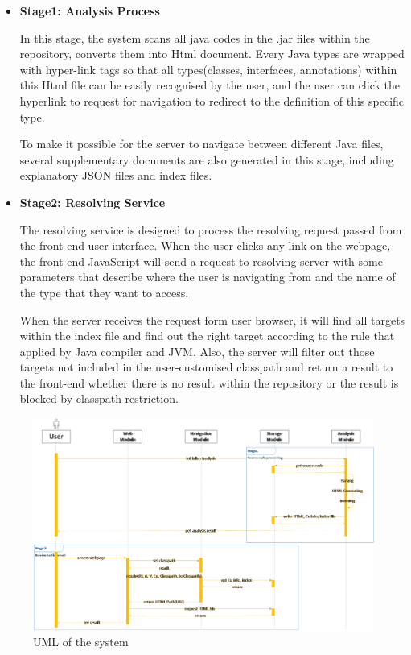 \documentclass[runningheads]{llncs}
\begin{document}
\begin{itemize}
	\item \textbf{Stage1: Analysis Process}

	In this stage, the system scans all java codes in the .jar files within the repository, converts them into Html document. Every Java types are wrapped with hyper-link tags so that all types(classes, interfaces, annotations) within this Html file can be easily recognised by the user, and the user can click the hyperlink to request for navigation to redirect to the definition of this specific type.

	To make it possible for the server to navigate between different Java files, several supplementary documents are also generated in this stage, including explanatory JSON files and index files.
	

	\item \textbf{Stage2: Resolving Service}

	The resolving service is designed to process the resolving request passed from the front-end user interface. When the user clicks any link on the webpage, the front-end JavaScript will send a request to resolving server with some parameters that describe where the user is navigating from and the name of the type that they want to access.

	When the server receives the request form user browser, it will find all targets within the index file and find out the right target according to the rule that applied by Java compiler and JVM. Also, the server will filter out those targets not included in the user-customised classpath and return a result to the front-end whether there is no result within the repository or the result is blocked by classpath restriction.
\end{itemize}


\begin{figure}[H]
	\centering
	\includegraphics[width=12cm]{pic/system-uml.png}
	\caption{UML of the system}
	\label{UML of the system}
\end{figure}
\end{document}
